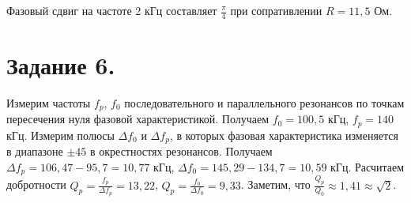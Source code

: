 	\noindent Фазовый сдвиг на частоте 2 кГц составляет $\frac{\pi}{4}$ при сопративлении $R = 11,5$ Ом.


	\section*{Задание 6.}

	\noindent Измерим частоты $f_p$, $f_0$ последовательного и параллельного резонансов по точкам пересечения нуля фазовой характеристикой.
	Получаем $f_0 = 100,5$ кГц, $f_p = 140$ кГц.
	Измерим полюсы $\Delta f_0$ и $\Delta f_p$, в которых фазовая характеристика изменяется в диапазоне $\pm 45$ в окрестностях
	резонансов. Получаем $\Delta f_p = 106,47 - 95,7 = 10,77$ кГц, $\Delta f_0 = 145,29 - 134,7 = 10,59$ кГц. 
	\vspace*{5mm}
	\noindent Расчитаем добротности $Q_p = \frac{f_p}{\Delta f_p} = 13,22$, $Q_p = \frac{f_0}{\Delta f_0} = 9,33$.
	Заметим, что $\frac{Q_p}{Q_0} \approx 1,41 \approx \sqrt{2}$.


